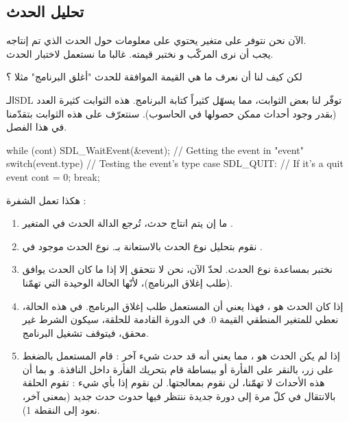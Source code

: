 \subsection{تحليل الحدث}

الآن نحن نتوفر على متغير
يحتوي على معلومات حول الحدث الذي تم إنتاجه.\\
يجب أن نرى المركّب
و نختبر قيمته. غالبا ما نستعمل
لاختبار الحدث.

\begin{question}
لكن كيف لنا أن نعرف ما هي القيمة الموافقة للحدث "أغلق البرنامج" مثلا ؟
\end{question}

الـ\textenglish{SDL}
توفّر لنا بعض الثوابت، مما يسهّل كثيراً كتابة البرنامج. هذه الثوابت كثيرة العدد (بقدر وجود أحداث ممكن حصولها في الحاسوب). سنتعرّف على هذه الثوابت بتقدّمنا في هذا الفصل.

\begin{Csource}
while (cont)
{
	SDL_WaitEvent(&event); // Getting the event in "event"
	switch(event.type) // Testing the event's type
	{
		case SDL_QUIT: // If it's a quit event
		cont = 0;
		break;
	}
}
\end{Csource}

هكذا تعمل الشفرة :

\begin{enumerate}
	\item ما إن يتم انتاج حدث، تُرجع الدالة 
	الحدث في المتغير 
	.
	\item نقوم بتحليل نوع الحدث بالاستعانة بـ.
	نوع الحدث موجود في
	.
	\item نختبر بمساعدة 
	نوع الحدث. لحدّ الآن، نحن لا نتحقق إلا إذا ما كان الحدث يوافق
	(طلب إغلاق البرنامج)، لأنّها الحالة الوحيدة التي تهمّنا.
	\item إذا كان الحدث هو 
	،
	فهذا يعني أن المستعمل طلب إغلاق البرنامج. في هذه الحالة، نعطي للمتغير المنطقي
	القيمة 0. في الدورة القادمة للحلقة، سيكون الشرط غير محقق، فيتوقف تشغيل البرنامج.
	\item إذا لم يكن الحدث هو 
	،
	مما يعني أنه قد حدث شيء آخر : قام المستعمل بالضغط على زر، بالنقر على الفأرة أو ببساطة قام بتحريك الفأرة داخل النافذة. و بما أن هذه الأحداث لا تهمّنا، لن نقوم بمعالجتها. لن نقوم إذا بأي شيء : تقوم الحلقة بالانتقال في كلّ مرة إلى دورة جديدة ننتظر فيها حدوث حدث جديد (بمعنى آخر، نعود إلى النقطة 1).
\end{enumerate}

